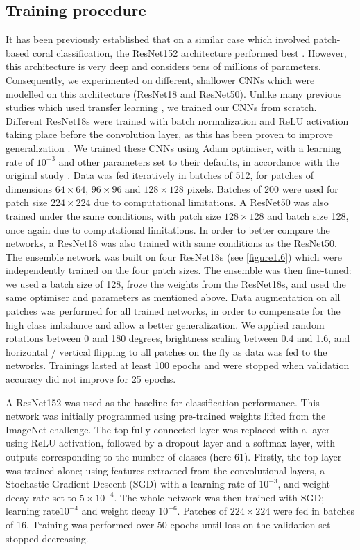 \subsection{Training procedure}\label{chapitre1_5.1}
It has been previously established that on a similar case which involved patch-based coral classification, the ResNet152 architecture performed best \citep{king_comparison_2018}. However, this architecture is very deep and considers tens of millions of parameters. Consequently, we experimented on different, shallower CNNs which were modelled on this architecture (ResNet18 and ResNet50). Unlike many previous studies which used transfer learning \citep{king_comparison_2018, mahmood_coral_2016, mahmood_deep_2017}, we trained our CNNs from scratch. Different ResNet18s were trained with batch normalization and ReLU activation taking place before the convolution layer, as this has been proven to improve generalization \citep{he_identity_2016}. We trained these CNNs using Adam optimiser, with a learning rate of $10^{-3}$ and other parameters set to their defaults, in accordance with the original study \citep{kingma_adam:_2014}. Data was fed iteratively in batches of 512, for patches of dimensions \(64 \times 64\), \(96 \times 96\) and \(128 \times 128\) pixels. Batches of 200 were used for patch size \(224 \times 224\) due to computational limitations. A ResNet50 was also trained under the same conditions, with patch size \(128 \times 128\) and batch size 128, once again due to computational limitations. In order to better compare the networks, a ResNet18 was also trained with same conditions as the ResNet50. The ensemble network was built on four ResNet18s (see \autoref{figure1.6}) which were independently trained on the four patch sizes. The ensemble was then fine-tuned: we used a batch size of 128, froze the weights from the ResNet18s, and used the same optimiser and parameters as mentioned above. Data augmentation on all patches was performed for all trained networks, in order to compensate for the high class imbalance and allow a better generalization. We applied random rotations between 0 and 180 degrees, brightness scaling between 0.4 and 1.6, and horizontal / vertical flipping to all patches on the fly as data was fed to the networks. Trainings lasted at least 100 epochs and were stopped when validation accuracy did not improve for 25 epochs.

A ResNet152 was used as the baseline for classification performance. This network was initially programmed using pre-trained weights lifted from the ImageNet challenge. The top fully-connected layer was replaced with a layer using ReLU activation, followed by a dropout layer and a softmax layer, with outputs corresponding to the number of classes (here 61). Firstly, the top layer was trained alone; using features extracted from the convolutional layers, a Stochastic Gradient Descent (SGD) with a learning rate of $10^{-3}$, and weight decay rate set to $5\times10^{-4}$. The whole network was then trained with SGD; learning rate$10^{-4}$ and weight decay $10^{-6}$. Patches of \(224 \times 224\) were fed in batches of 16. Training was performed over 50 epochs until loss on the validation set stopped decreasing.

